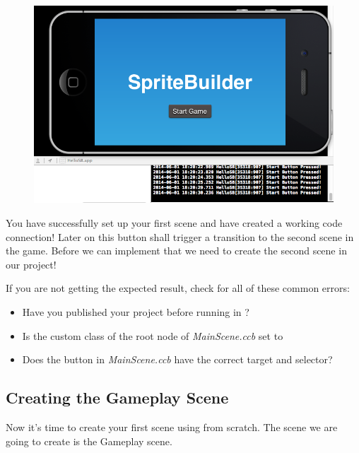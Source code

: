 \begin{figure}[H]
		\centering
		\includegraphics[width=0.9\linewidth]{images/firstproject/button_success_log.png}
\end{figure}

You have successfully set up your first \SB{} scene and have created a working
code connection! Later on this button shall trigger a transition to the second
scene in the game. Before we can implement that we need to create the second
scene in our \SB{} project!

\begin{details}
If you are not getting the expected result, check for all of these common
errors:
\begin{itemize}
  \item Have you published your \SB{} project before running in \xcode{}?
  \item Is the custom class of the root node of \textit{MainScene.ccb} set to
  \item Does the button in \textit{MainScene.ccb} have the correct target and
  selector?
\end{itemize}
\end{details}

\subsection{Creating the Gameplay Scene}
Now it's time to create your first scene using \SB{} from scratch. The scene we
are going to create is the Gameplay scene. 

